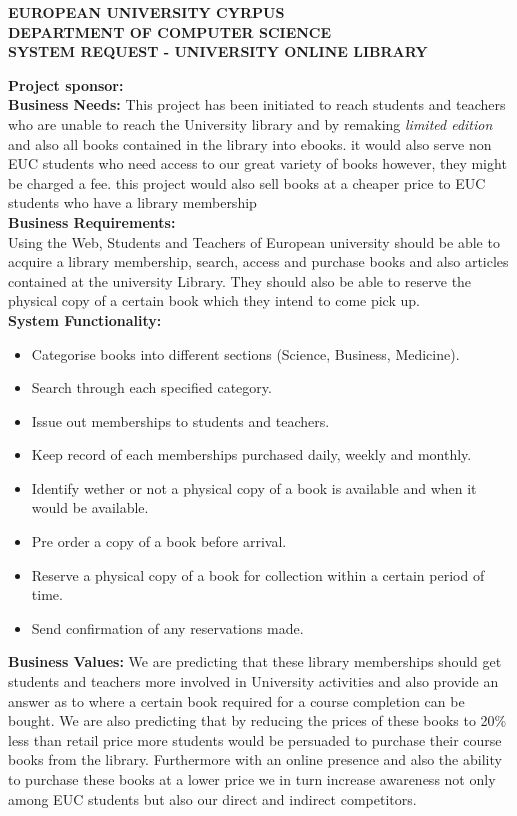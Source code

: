 \documentclass{article}
\begin{document}
	\begin{center}
		\textbf{\large EUROPEAN UNIVERSITY CYRPUS \\
			DEPARTMENT OF COMPUTER SCIENCE \\
			SYSTEM REQUEST - UNIVERSITY ONLINE LIBRARY \\}
	\end{center}
\textbf{Project sponsor:} \\
[2.25mm]
\textbf{Business Needs:} This project has been initiated to reach students and teachers who are unable to reach the University library and by remaking {\textit {limited edition}} and also all books contained in the library into ebooks. it would also serve non EUC students who need access to our great variety of books however, they might be charged a fee. this project would also sell books at a cheaper price to EUC students who have a library membership\\
[2.25mm]
\textbf{Business Requirements:}\\
Using the Web, Students and Teachers of European university should be able to acquire a library membership, search, access and purchase books and also articles contained at the university Library. They should also be able to reserve the physical copy of a certain book which they intend to come pick up. \\
[2.25mm]
\textbf{System Functionality:}
\begin {itemize}
\item Categorise books into different sections (Science, Business, Medicine).
\item Search through each specified category.
\item Issue out memberships to students and teachers.
\item Keep record of each memberships purchased daily, weekly and monthly.
\item Identify wether or not a physical copy of a book is available and when it would be available.
\item Pre order a copy of a book before arrival.
\item Reserve a physical copy of a book for collection within a certain period of time.
\item Send confirmation of any reservations made.\\
\end{itemize}
\textbf{Business Values:}
We are predicting that these library memberships should get students and teachers more involved in University activities and also provide an answer as to where a certain book required for a course completion can be bought. We are also predicting that by reducing the prices of these books to 20\% less than retail price more students would be persuaded to purchase their course books from the library. Furthermore with an online presence and also the ability to purchase these books at a lower price we in turn increase awareness not only among EUC students but also our direct and indirect competitors. 
\end{document}
